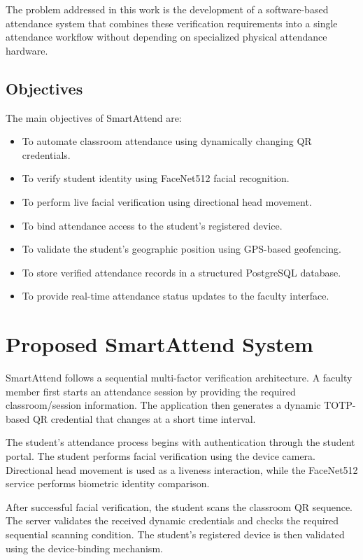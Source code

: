 \documentclass[conference]{IEEEtran}
\begin{document}
The problem addressed in this work is the development of a software-based attendance system that combines these verification requirements into a single attendance workflow without depending on specialized physical attendance hardware.

\subsection{Objectives}

The main objectives of SmartAttend are:

\begin{itemize}
    \item To automate classroom attendance using dynamically changing QR credentials.
    \item To verify student identity using FaceNet512 facial recognition.
    \item To perform live facial verification using directional head movement.
    \item To bind attendance access to the student's registered device.
    \item To validate the student's geographic position using GPS-based geofencing.
    \item To store verified attendance records in a structured PostgreSQL database.
    \item To provide real-time attendance status updates to the faculty interface.
\end{itemize}


\section{Proposed SmartAttend System}

SmartAttend follows a sequential multi-factor verification architecture. A faculty member first starts an attendance session by providing the required classroom/session information. The application then generates a dynamic TOTP-based QR credential that changes at a short time interval.

The student's attendance process begins with authentication through the student portal. The student performs facial verification using the device camera. Directional head movement is used as a liveness interaction, while the FaceNet512 service performs biometric identity comparison.

After successful facial verification, the student scans the classroom QR sequence. The server validates the received dynamic credentials and checks the required sequential scanning condition. The student's registered device is then validated using the device-binding mechanism.
\end{document}
